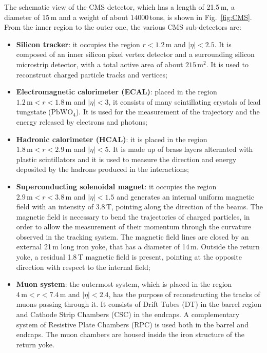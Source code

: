The schematic view of the CMS detector, which has a length of 21.5\,m, a diameter of 15\,m and a weight of about $14000$\,tons, is shown in Fig.~\ref{fig:CMS}. From the inner region to the outer one, the various CMS sub-detectors are:
\begin{itemize}
\item {\bf Silicon tracker}: it occupies the region $r < 1.2$\,m and $|\eta|<2.5$. It is composed of an inner silicon pixel vertex detector and a surrounding silicon microstrip detector, with a total active area of about $215\,\mathrm{m^2}$. It is used to reconstruct charged particle tracks and vertices;
\item {\bf Electromagnetic calorimeter (ECAL)}: placed in the region $1.2\,\mathrm{m} < r < 1.8\,\mathrm{m}$ and $|\eta|<3$, it consists of many scintillating crystals of lead tungstate ($\mathrm{PbWO_4}$). It is used for the measurement of the trajectory and the energy released by electrons and photons;
\item {\bf Hadronic calorimeter (HCAL)}: it is placed in the region $1.8\,\mathrm{m} < r < 2.9\,\mathrm{m}$ and $|\eta|<5$. It is made up of brass layers alternated with plastic scintillators and it is used to measure the direction and energy deposited by the hadrons produced in the interactions;
\item {\bf Superconducting solenoidal magnet}: it occupies the region $2.9\,\mathrm{m} < r < 3.8\,\mathrm{m}$ and $|\eta|<1.5$ and generates an internal uniform magnetic field with an intensity of 3.8\,T, pointing along the direction of the beams. The magnetic field is necessary to bend the trajectories of charged particles, in order to allow the measurement of their momentum through the curvature observed in the tracking system. The magnetic field lines are closed by an external 21\,m long iron yoke, that has a diameter of 14\,m. Outside the return yoke, a residual 1.8\,T magnetic field is present, pointing at the opposite direction with respect to the internal field;
\item {\bf Muon system}: the outermost system, which is placed in the region $4\,\mathrm{m} < r < 7.4\,\mathrm{m}$ and $|\eta|<2.4$, has the purpose of reconstructing the tracks of muons passing through it. It consists of Drift Tubes (DT) in the barrel region and Cathode Strip Chambers (CSC) in the endcaps. A complementary system of Resistive Plate Chambers (RPC) is used both in the barrel and endcaps. The muon chambers are housed inside the iron structure of the return yoke.
\end{itemize}

